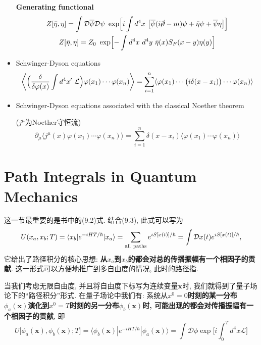 \begin{itemize}
        \textbf{Generating functional}
        \begin{gather*}
          Z[\bar{\eta}, \eta] = \int \mathcal{D}\overline{\psi} \mathcal{D}\psi\ \exp\Bigl[i\int d^4x\ \bigl[\overline{\psi}(i\cancel{\partial}-m)\psi + \bar{\eta}\psi + \overline{\psi}\eta\bigr]\Bigr] \\
          Z[\bar{\eta}, \eta] = Z_0\ \exp\Bigl[-\int d^4x\ d^4y\ \bar{\eta}(x)S_F(x-y)\eta(y)\Bigr]
        \end{gather*}
  \item Schwinger-Dyson equations
        \begin{equation*}
          \biggl\langle\Bigl(\frac{\delta}{\delta\varphi(x)}\int d^4x'\ \mathcal{L}\Bigr) \varphi(x_1)\cdots \varphi(x_n)\biggr\rangle = \sum_{i=1}^{n}\langle\varphi(x_1)\cdots \bigl(i\delta(x-x_i)\bigr)\cdots\varphi(x_n) \rangle
        \end{equation*}
  \item Schwinger-Dyson equations associated with the classical Noether theorem

        ($j^\mu$为Noether守恒流)
        \begin{equation*}
          \partial_\mu \langle j^\mu(x) \varphi(x_1)\cdots\varphi(x_n)\rangle = \sum_{i=1}^{n}\delta(x-x_i)\langle\varphi(x_1)\cdots\varphi(x_n)\rangle
        \end{equation*}

\end{itemize}
\pagestyle{general}

\section{Path Integrals in Quantum Mechanics}

这一节最重要的是书中的(9.2)式. 结合(9.3), 此式可以写为
\begin{equation}\label{eq: path_nonfield}
  U(x_a,x_b;T)=\langle x_b|e^{-iHT/\hbar}|x_a \rangle = \sum_{\rm all\ paths} e^{iS[x(t)]/\hbar} = \int \mathcal{D}x(t)e^{iS[x(t)]/\hbar},
\end{equation}
它给出了路径积分的核心思想: \textbf{从$x_a$到$x_b$的都会对总的传播振幅有一个相因子的贡献}. 这一形式可以方便地推广到多自由度的情况, 此时的路径指.

当我们考虑无限自由度, 并且将自由度下标写为连续变量$\mathbf{x}$时, 我们就得到了量子场论下的“路径积分”形式. 在量子场论中我们有: 系统从\textbf{$x^0=0$时刻的某一分布$\phi_a(\mathbf{x})$演化到$x^0=T$时刻的另一分布$\phi_b(\mathbf{x})$时, 可能出现的都会对传播振幅有一个相因子的贡献}, 即
\begin{equation*}
  U\bigl[\phi_a(\mathbf{x}),\phi_b(\mathbf{x});T\bigr]=\langle \phi_b(\mathbf{x})|e^{-iHT/\hbar}|\phi_a(\mathbf{x}) \rangle = \int \mathcal{D}\phi \exp\biggl[i\int_{0}^{T} d^4x\mathcal{L}\biggr]
\end{equation*}

